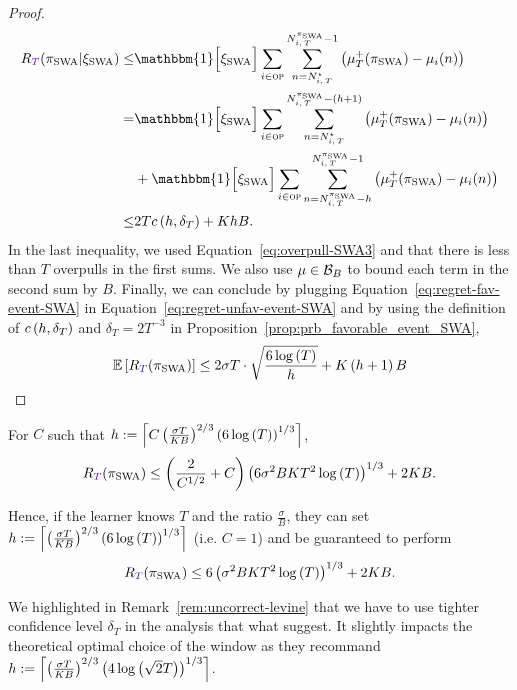 \begin{proof}
\begin{align}
\regret(\piSWA| \HPevent_{\rm SWA}) \leq&  \mathbbm{1} \Big[\HPevent_{\rm SWA}\Big] \sum_{i\in \overpullSet}    \sum_{n=\NiT^\star}^{\NiT^{\piSWA}-1} \pa{\mu^+_T(\piSWA) - \mu_i(n)}\nonumber\\
=&  \mathbbm{1} \Big[\HPevent_{\rm SWA}\Big] \sum_{i\in \overpullSet}    \sum_{n=\NiT^\star}^{\NiT^{\piSWA}-\pa{h+1}} \pa{\mu^+_T(\piSWA) - \mu_i(n)} \nonumber\\ 
&+ \mathbbm{1} \Big[\HPevent_{\rm SWA}\Big] \sum_{i\in \overpullSet} \sum_{n=\NiT^{\piSWA} - h }^{\NiT^{\piSWA}-1} \pa{\mu^+_T(\piSWA) - \mu_i(n)}\nonumber\\
\leq& 2Tc\pa{h,\delta_T} + KhB.
\label{eq:regret-fav-event-SWA}
\end{align}
In the last inequality, we used Equation~\ref{eq:overpull-SWA3} and that there is less than $T$ overpulls in the first sums. We also use $\mu \in \mathcal{B}_{B}$ to bound each term in the second sum by $B$. Finally,  we can conclude by plugging Equation~\ref{eq:regret-fav-event-SWA} in Equation~\ref{eq:regret-unfav-event-SWA} and by using the definition of $c\left(h,\delta_T\right)$ and $\delta_T= 2T^{-3}$ in Proposition~\ref{prop:prb_favorable_event_SWA},
\[
\EE{\regret(\piSWA)} \leq 2\sigma T\cdot\sqrt{\frac{6\log\pa{T}}{h}} + K\pa{h+1}B
\]
\end{proof}
\begin{corollary}
For $C$ such that $h:= \left\lceil C \left(\frac{\sigma T}{KB}\right)^{2/3}\left(6\log\left(T\right)\right)^{1/3}\right\rceil$, 
\[
\regret(\piSWA) \leq \pa{\frac{2}{C^{1/2}} + C} \pa{6 \sigma^2 B K T^2 \log\pa{T}}^{1/3} + 2KB. 
\]

Hence, if the learner knows $T$ and the ratio $\frac{\sigma}{B}$, they can set $h:= \left\lceil\left(\frac{\sigma T}{KB}\right)^{2/3}\left(6\log\left(T\right)\right)^{1/3}\right\rceil$ (i.e. $C=1$) and be guaranteed to perform 
\[
\regret(\piSWA) \leq 6 \pa{\sigma^2 B K T^2 \log\pa{T}}^{1/3} + 2KB. 
\]

\end{corollary}

\begin{remark}
\label{rem:comparaison-levine}
We highlighted in Remark~\ref{rem:uncorrect-levine} that we have to use tighter confidence level $\delta_T$  in the analysis that what \citet{levine2017rotting} suggest. It slightly impacts the theoretical optimal choice of the window as they recommand  $h:= \left\lceil\left(\frac{\sigma T}{KB}\right)^{2/3}\left(4\log\left(\sqrt{2}T\right)\right)^{1/3}\right\rceil$.
\end{remark}

